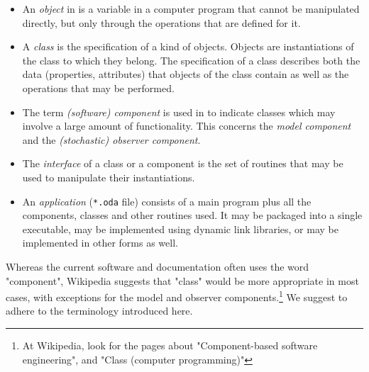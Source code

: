 \begin{itemize}
	\item An \emph{object} in \oda is a variable in a computer program that cannot be manipulated directly, but only through the operations that are defined for it. 
	\item A \emph{class} is the specification of a kind of objects. Objects are instantiations of the class to which they belong. The specification of a class describes both the data (properties, attributes) that objects of the class contain as well as the operations that may be performed. 
	\item The term \emph{(software) component} is used in \oda to indicate classes which may involve a large amount of functionality. This concerns the \emph{\oda model component} and the \emph{\oda (stochastic) observer component}. 
	\item The \emph{interface} of a class or a component is the set of routines that may be used to manipulate their instantiations. 
        \item An \emph{\oda application} (\verb|*.oda| file) consists of a main program plus all the components, classes and other routines used. It may be packaged into a single executable, may be implemented using dynamic link libraries, or may be implemented in other forms as well. 
\end{itemize}

Whereas the current \oda software and documentation often uses the word "component", Wikipedia suggests that "class" would be more appropriate in most cases, with exceptions for the model and observer components.\footnote{At Wikipedia, look for the pages about "Component-based software engineering", and "Class (computer programming)"} We suggest to adhere to the terminology introduced here.

